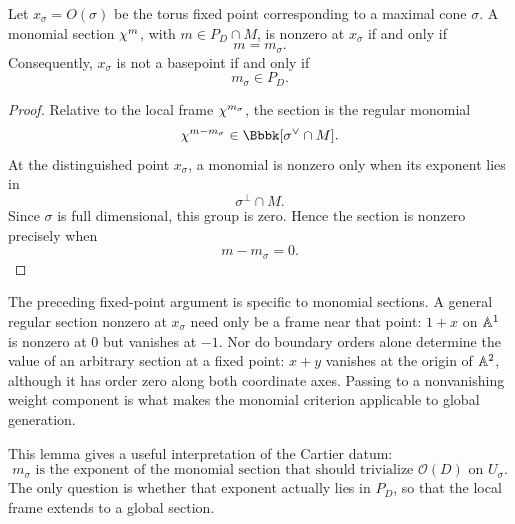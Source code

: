 \begin{lemma}
\label{lem:section-nonzero-fixed-point}
Let \(x_\sigma=O(\sigma)\) be the torus fixed point corresponding to a
maximal cone \(\sigma\). A monomial section \(\chi^{m}\), with
\(m\in P_D\cap M\), is nonzero at \(x_\sigma\) if and only if
\[
m=m_\sigma.
\]
Consequently, \(x_\sigma\) is not a basepoint if and only if
\[
m_\sigma\in P_D.
\]
\end{lemma}

\begin{proof}
Relative to the local frame \(\chi^{m_\sigma}\), the section is
the regular monomial
\[
\character{m-m_\sigma}\in\Bbbk[\sigma^\vee\cap M].
\]
At the distinguished point \(x_\sigma\), a monomial is nonzero only
when its exponent lies in
\[
\sigma^\perp\cap M.
\]
Since \(\sigma\) is full dimensional, this group is zero. Hence the
section is nonzero precisely when
\[
m-m_\sigma=0.
\]
\end{proof}

\begin{observation}
\label{obs:classroom-eigensection-hypothesis}
The preceding fixed-point argument is specific to monomial sections.
A general regular section nonzero at \(x_\sigma\) need only be a
frame near that point: \(1+x\) on \(\mathbb{A}^1\) is nonzero at \(0\)
but vanishes at \(-1\). Nor do boundary orders alone determine the
value of an arbitrary section at a fixed point: \(x+y\) vanishes at
the origin of \(\mathbb{A}^2\), although it has order zero along both
coordinate axes. Passing to a nonvanishing weight component is what
makes the monomial criterion applicable to global generation.
\end{observation}

This lemma gives a useful interpretation of the Cartier datum:
\[
\boxed{
 m_\sigma
 \text{ is the exponent of the monomial section that should
 trivialize }\mathcal O(D)\text{ on }U_\sigma.
}
\]
The only question is whether that exponent actually lies in \(P_D\),
so that the local frame extends to a global section.

